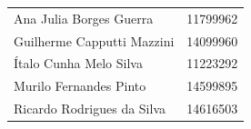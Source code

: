 \documentclass[12pt, a4]{article}
\begin{document}
\begin{titlepage}
\textbf{\disciplina}

\vspace{0.5cm}

\textbf{\prof}

\vspace{0.5cm}

\begin{flushright}
\begin{tabular}{l l}
    Ana Julia Borges Guerra & 11799962\\
    Guilherme Capputti Mazzini & 14099960\\
    Ítalo Cunha Melo Silva & 11223292\\
    Murilo Fernandes Pinto & 14599895\\
    Ricardo Rodrigues da Silva & 14616503
\end{tabular}
\end{flushright}

\vfill
\data

\end{titlepage}
\pagebreak
\end{document}
